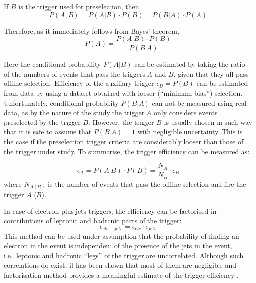 If $B$ is the trigger used for preselection, then
\begin{equation}
P(A, B) = P(A | B) \cdot P(B) = P(B | A) \cdot P(A)
\end{equation}

Therefore, as it immediately follows from Bayes' theorem,
\begin{equation}
P(A) = \frac{P(A | B) \cdot P(B)}{P(B | A)}
\end{equation}

Here the conditional probability $P(A|B)$ can be estimated by taking the ratio of the numbers of events that pass the
triggers $A$ and $B$, given that they all pass offline selection. Efficiency of the auxiliary trigger $\epsilon_{B} =
P(B)$ can be estimated from data by using a dataset obtained with looser (``minimum bias'') selection. Unfortunately,
conditional probability $P(B|A)$ can not be measured using real data, as by the nature of the study the trigger $A$ only
considers events preselected by the trigger $B$. However, the trigger $B$ is usually chosen in such way that it is safe
to assume that $P(B|A) = 1$ with negligible uncertainty. This is the case if the preselection trigger criteria are
considerably looser than those of the trigger under study. To summarise, the trigger efficiency can be measured as:

\begin{equation}
\epsilon_{A} = P(A|B) \cdot P(B) = \frac{N_A}{N_B} \cdot \epsilon_{B}
\end{equation}
where $N_{A (B)}$ is the number of events that pass the offline selection and fire the trigger $A$ ($B$).


In case of electron plus jets triggers, the efficiency can be factorised in contributions of leptonic and hadronic parts
of the trigger:
\begin{equation}
\epsilon_{ele+jets} = \epsilon_{ele} \cdot \epsilon_{jets}
\end{equation}
This method can be used under assumption that the probability of finding an electron in the event is independent of the
presence of the jets in the event, i.e.\ leptonic and hadronic ``legs'' of the trigger are uncorrelated. Although
such correlations do exist, it has been shown that most of them are negligible and factorisation method provides a
meaningful estimate of the trigger efficiency \autocite{d0_note_top_trigger_efficiency}.

